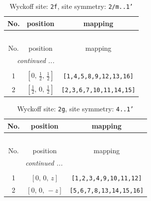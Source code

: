 \documentclass[fleqn,8pt]{jsarticle}
\begin{document}
\renewcommand{\arraystretch}{1.2}
\begin{longtable}{ccc}
\caption{Wyckoff site: {\tt 2f}, site symmetry: {\tt 2/m..1'}}
 \\
 \hline \hline
No. & position & mapping \\ \hline \endfirsthead

\multicolumn{2}{l}{\tablename\ \thetable{}} \\
 \hline \hline
No. & position & mapping \\ \hline \endhead

 \hline \hline
\multicolumn{2}{r}{\footnotesize\it continued ...} \\ \endfoot

 \hline \hline
\multicolumn{2}{r}{} \\ \endlastfoot

1 & $\left[ 0,\, \frac{1}{2},\, \frac{1}{2} \right]$ & {\tt [1,4,5,8,9,12,13,16]} \\ \hline
2 & $\left[ \frac{1}{2},\, 0,\, \frac{1}{2} \right]$ & {\tt [2,3,6,7,10,11,14,15]} \\
\end{longtable}
\renewcommand{\arraystretch}{1.2}
\begin{longtable}{ccc}
\caption{Wyckoff site: {\tt 2g}, site symmetry: {\tt 4..1'}}
 \\
 \hline \hline
No. & position & mapping \\ \hline \endfirsthead

\multicolumn{2}{l}{\tablename\ \thetable{}} \\
 \hline \hline
No. & position & mapping \\ \hline \endhead

 \hline \hline
\multicolumn{2}{r}{\footnotesize\it continued ...} \\ \endfoot

 \hline \hline
\multicolumn{2}{r}{} \\ \endlastfoot

1 & $\left[ 0,\, 0,\, z \right]$ & {\tt [1,2,3,4,9,10,11,12]} \\ \hline
2 & $\left[ 0,\, 0,\, - z \right]$ & {\tt [5,6,7,8,13,14,15,16]} \\
\end{longtable}
\renewcommand{\arraystretch}{1.2}
\end{document}
